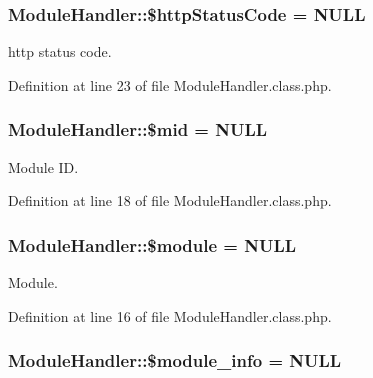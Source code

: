 \hypertarget{classModuleHandler_a033e864206ca6a6494af015baa5d2365}{}
\subsubsection[{\$http\+Status\+Code}]{\setlength{\rightskip}{0pt plus 5cm}Module\+Handler\+::\$http\+Status\+Code = N\+U\+L\+L}\label{classModuleHandler_a033e864206ca6a6494af015baa5d2365}


http status code. 



Definition at line 23 of file Module\+Handler.\+class.\+php.

\hypertarget{classModuleHandler_a6bb7e9e29c0fb9893d051179281b093e}{}
\subsubsection[{\$mid}]{\setlength{\rightskip}{0pt plus 5cm}Module\+Handler\+::\$mid = N\+U\+L\+L}\label{classModuleHandler_a6bb7e9e29c0fb9893d051179281b093e}


Module I\+D. 



Definition at line 18 of file Module\+Handler.\+class.\+php.

\hypertarget{classModuleHandler_a24f28ac6c101582f043bef672a9f3b00}{}
\subsubsection[{\$module}]{\setlength{\rightskip}{0pt plus 5cm}Module\+Handler\+::\$module = N\+U\+L\+L}\label{classModuleHandler_a24f28ac6c101582f043bef672a9f3b00}


Module. 



Definition at line 16 of file Module\+Handler.\+class.\+php.

\hypertarget{classModuleHandler_a2388e5ef665a5a82efa00c8c894df33c}{}
\subsubsection[{\$module\+\_\+info}]{\setlength{\rightskip}{0pt plus 5cm}Module\+Handler\+::\$module\+\_\+info = N\+U\+L\+L}\label{classModuleHandler_a2388e5ef665a5a82efa00c8c894df33c}


